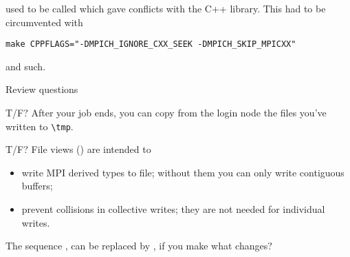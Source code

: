  used to be called 
which gave conflicts with the C++ library. This had to be circumvented
with
\begin{verbatim}
make CPPFLAGS="-DMPICH_IGNORE_CXX_SEEK -DMPICH_SKIP_MPICXX"
\end{verbatim}
and such.


\newpage
{} {Review questions}

\begin{tacc}
  \begin{exercise}
    T/F?
    After your  job ends, you can copy
    from the login node
    the files you've written to \verb+\tmp+. 
\end{exercise}
\end{tacc}

\begin{exercise}
  T/F?
  File views () are intended to
  \begin{itemize}
  \item write MPI derived types to file; without them you can only write
    contiguous buffers;
  \item prevent collisions in collective writes; they are not needed for
    individual writes.
  \end{itemize}
\end{exercise}

\begin{exercise}
  The sequence , 
  can be replaced by , 
  if you make what changes?
\end{exercise}
